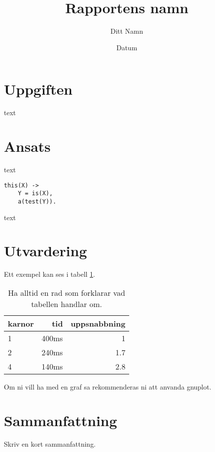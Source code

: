 \documentclass[a4paper, 11pt]{article}
\title{Rapportens namn}
\author{Ditt Namn}
\date{Datum}
\begin{document}
\maketitle 

\section{Uppgiften}

text

\section{Ansats}

text

\begin{verbatim}
this(X) ->
    Y = is(X),
    a(test(Y)).
\end{verbatim}

text

\section{Utvardering}

Ett exempel kan ses i tabell \ref{tab:results}. 


\begin{table}
\centering
\begin{tabular}{|l|r|r|}  
\hline
karnor & tid & uppsnabbning\\
\hline
1 & 400ms & 1\\
\hline
2 & 240ms & 1.7\\
\hline
4 & 140ms & 2.8\\
\hline
\end{tabular}
\caption{Ha alltid en rad som forklarar vad tabellen handlar om.}
\label{tab:results}
\end{table}

Om ni vill ha med en graf sa rekommenderas ni att anvanda gnuplot. 

\section{Sammanfattning}

Skriv en kort sammanfattning.
\end{document}
